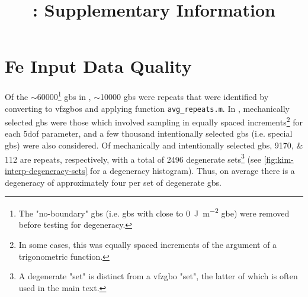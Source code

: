 \documentclass[preprint,12pt]{elsarticle}
\begin{document}
	\sloppy %
	
	\begin{frontmatter}
		
		\title{\mytitletwo{}: Supplementary Information}
		
		
		
	\end{frontmatter}
	
	
\section{Fe Input Data Quality}
	\label{sec:supp:kim-interp:quality}
	Of the $\sim$\num{60000}\footnote{The "no-boundary" \glspl{gb} (i.e. \glspl{gb} with close to \SI{0}{\joule\per\square\meter} \gls{gbe}) were removed before testing for degeneracy.} \glspl{gb} in \cite{kimPhasefieldModeling3D2014}, $\sim$\num{10000} \glspl{gb} were repeats that were identified by converting to \glspl{vfzgbo} and applying \vfzorepo{} function \texttt{avg\_repeats.m}. In \cite{kimPhasefieldModeling3D2014}, mechanically selected \glspl{gb} were those which involved sampling in equally spaced increments\footnote{In some cases, this was equally spaced increments of the argument of a trigonometric function.} for each \gls{5dof} parameter, and a few thousand intentionally selected \glspl{gb} (i.e. special \glspl{gb}) were also considered. Of mechanically and intentionally selected \glspl{gb}, \numlist{9170;112} are repeats, respectively, with a total of \num{2496} degenerate sets\footnote{A degenerate "set" is distinct from a \gls{vfzgbo} "set", the latter of which is often used in the main text.} (see \cref{fig:kim-interp-degeneracy-sets} for a degeneracy histogram). Thus, on average there is a degeneracy of approximately four per set of degenerate \glspl{gb}.
	
\end{document}
